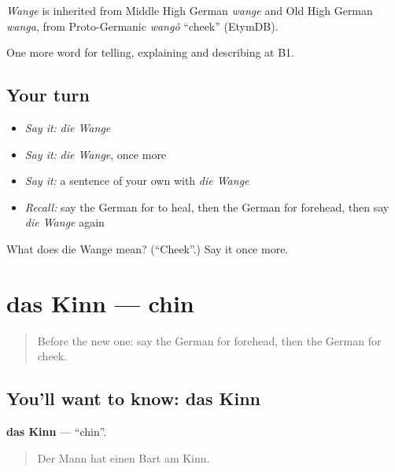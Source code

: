 \begin{cousinweb}
\emph{Wange} is inherited from Middle High German \emph{wange} and Old High German \emph{wanga}, from Proto-Germanic \emph{wangô} \textquotedblleft{}cheek\textquotedblright{} (EtymDB).
\end{cousinweb}

\begin{grammarlens}[title={What you've built}]
One more word for telling, explaining and describing at B1.
\end{grammarlens}

\subsection*{Your turn}
\begin{itemize}
\raggedright
  \item \emph{Say it:} \emph{die Wange}
  \item \emph{Say it:} \emph{die Wange}, once more
  \item \emph{Say it:} a sentence of your own with \emph{die Wange}
  \item \emph{Recall:} say the German for to heal, then the German for forehead, then say \emph{die Wange} again
\end{itemize}

\begin{tcolorbox}[breakable,colback=teal!4,colframe=teal!35!black,title={Before you move on}]
What does die Wange mean? (\textquotedblleft{}Cheek\textquotedblright{}.) Say it once more.
\end{tcolorbox}
\section[das Kinn]{das Kinn — chin}

\label{lesson:GE-C484-kinn}



\begin{quote}
Before the new one: say the German for forehead, then the German for cheek.
\end{quote}

\subsection*{You'll want to know: das Kinn}
\textbf{das Kinn} — \textquotedblleft{}chin\textquotedblright{}.

\begin{quote}
Der Mann hat einen Bart am Kinn.
\end{quote}

